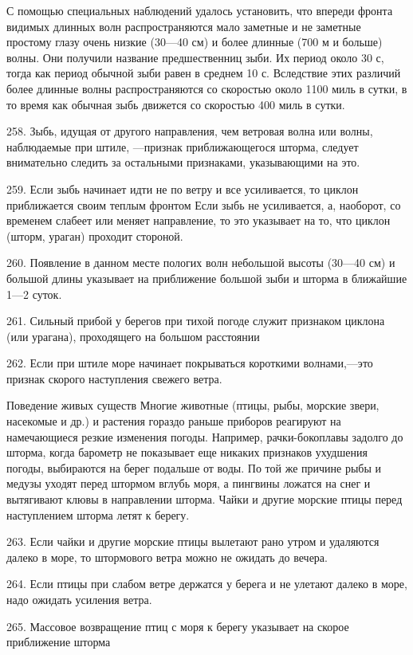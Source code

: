 С помощью специальных наблюдений удалось установить, что впереди фронта видимых длинных волн распространяются мало заметные и не заметные простому глазу очень низкие (30—40 см) и более длинные (700 м и больше) волны. Они получили название предшественниц зыби. Их период около 30 с, тогда как период обычной зыби равен в среднем 10 с. Вследствие этих различий более длинные волны распространяются со скоростью около 1100 миль в сутки, в то время как обычная зыбь движется со скоростью 400 миль в сутки.

258. Зыбь, идущая от другого направления, чем ветровая волна или волны, наблюдаемые при штиле, —признак приближающегося шторма, следует внимательно следить за остальными признаками, указывающими на это.

259. Если зыбь начинает идти не по ветру и все усиливается, то циклон приближается своим теплым фронтом Если зыбь не усиливается, а, наоборот, со временем слабеет или меняет направление, то это указывает на то, что циклон (шторм, ураган) проходит стороной.

260. Появление в данном месте пологих волн небольшой высоты (30—40 см) и большой длины указывает на приближение большой зыби и шторма в ближайшие 1—2 суток.

261. Сильный прибой у берегов при тихой погоде служит признаком циклона (или урагана), проходящего на большом расстоянии

262. Если при штиле море начинает покрываться короткими волнами,—это признак скорого наступления свежего ветра.

Поведение живых существ
Многие животные (птицы, рыбы, морские звери, насекомые и др.) и растения гораздо раньше приборов реагируют на намечающиеся резкие изменения погоды. Например, рачки-бокоплавы задолго до шторма, когда барометр не показывает еще никаких признаков ухудшения погоды, выбираются на берег подальше от воды. По той же причине рыбы и медузы уходят перед штормом вглубь моря, а пингвины ложатся на снег и вытягивают клювы в направлении шторма. Чайки и другие морские птицы перед наступлением шторма летят к берегу.

263. Если чайки и другие морские птицы вылетают рано утром и удаляются далеко в море, то штормового ветра можно не ожидать до вечера.

264. Если птицы при слабом ветре держатся у берега и не улетают далеко в море, надо ожидать усиления ветра.

265. Массовое возвращение птиц с моря к берегу указывает на скорое приближение шторма

